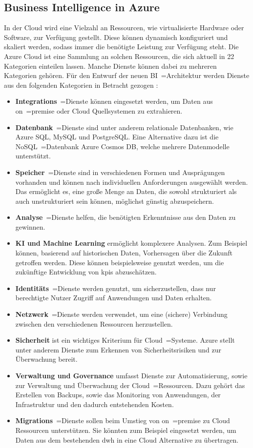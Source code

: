 \subsection{Business Intelligence in Azure} \label{subsec:grundlagen:azure:bi}
In der Cloud wird eine Vielzahl an Ressourcen, wie virtualisierte Hardware oder Software, zur Verfügung gestellt. Diese können dynamisch konfiguriert und skaliert werden, sodass immer die benötigte Leistung zur Verfügung steht. Die Azure Cloud ist eine Sammlung an solchen Ressourcen, die sich aktuell in 22 Kategorien einteilen lassen. Manche Dienste können dabei zu mehreren Kategorien gehören. Für den Entwurf der neuen BI~=Architektur werden Dienste aus den folgenden Kategorien in Betracht gezogen \cite{chilberto_building_2020}:
\begin{itemize}
\item \textbf{Integrations}~=Dienste können eingesetzt werden, um Daten aus on~=premise oder Cloud Quellsystemen zu extrahieren.
\item \textbf{Datenbank}~=Dienste sind unter anderem relationale Datenbanken, wie Azure SQL, MySQL und PostgreSQL. Eine Alternative dazu ist die NoSQL~=Datenbank Azure Cosmos DB, welche mehrere Datenmodelle unterstützt.
\item \textbf{Speicher}~=Dienste sind in verschiedenen Formen und Ausprägungen vorhanden und können nach individuellen Anforderungen ausgewählt werden. Das ermöglicht es, eine große Menge an Daten, die sowohl strukturiert als auch unstrukturiert sein können, möglichst günstig abzuspeichern.
\item \textbf{Analyse}~=Dienste helfen, die benötigten Erkenntnisse aus den Daten zu gewinnen.
\item \textbf{KI und Machine Learning} ermöglicht komplexere Analysen. Zum Beispiel können, basierend auf historischen Daten, Vorhersagen über die Zukunft getroffen werden. Diese können beispielsweise genutzt werden, um die zukünftige Entwicklung von \acp{kpi} abzuschätzen.
\item \textbf{Identitäts}~=Dienste werden genutzt, um sicherzustellen, dass nur berechtigte Nutzer Zugriff auf Anwendungen und Daten erhalten.
\item \textbf{Netzwerk}~=Dienste werden verwendet, um eine (sichere) Verbindung zwischen den verschiedenen Ressourcen herzustellen.
\item \textbf{Sicherheit} ist ein wichtiges Kriterium für Cloud~=Systeme. Azure stellt unter anderem Dienste zum Erkennen von Sicherheitsrisiken und zur Überwachung bereit.
\item \textbf{Verwaltung und Governance} umfasst Dienste zur Automatisierung, sowie zur Verwaltung und Überwachung der Cloud~=Ressourcen. Dazu gehört das Erstellen von Backups, sowie das Monitoring von Anwendungen, der Infrastruktur und den dadurch entstehenden Kosten.
\item \textbf{Migrations}~=Dienste sollen beim Umstieg von on~=premise zu Cloud Ressourcen unterstützen. Sie könnten zum Beispiel eingesetzt werden, um Daten aus dem bestehenden \ac{dwh} in eine Cloud Alternative zu übertragen.
\end{itemize}

